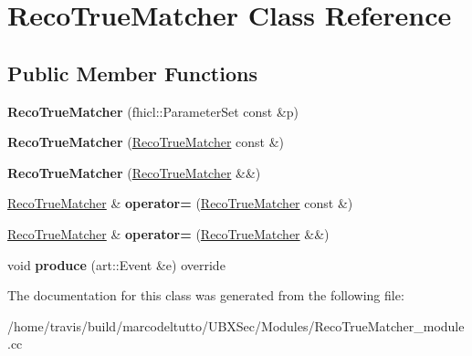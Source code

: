 \hypertarget{classRecoTrueMatcher}{\section{\-Reco\-True\-Matcher \-Class \-Reference}
\label{classRecoTrueMatcher}
}
\subsection*{\-Public \-Member \-Functions}
\begin{DoxyCompactItemize}
\item 
\hypertarget{classRecoTrueMatcher_a85eaff8fb078f81ef1ecd449ff41d694}{{\bfseries \-Reco\-True\-Matcher} (fhicl\-::\-Parameter\-Set const \&p)}\label{classRecoTrueMatcher_a85eaff8fb078f81ef1ecd449ff41d694}

\item 
\hypertarget{classRecoTrueMatcher_a4a04d47a0ea7b765f5be3091efbbfbae}{{\bfseries \-Reco\-True\-Matcher} (\hyperlink{classRecoTrueMatcher}{\-Reco\-True\-Matcher} const \&)}\label{classRecoTrueMatcher_a4a04d47a0ea7b765f5be3091efbbfbae}

\item 
\hypertarget{classRecoTrueMatcher_a2166966091ff725010f0d1bfe00dc635}{{\bfseries \-Reco\-True\-Matcher} (\hyperlink{classRecoTrueMatcher}{\-Reco\-True\-Matcher} \&\&)}\label{classRecoTrueMatcher_a2166966091ff725010f0d1bfe00dc635}

\item 
\hypertarget{classRecoTrueMatcher_aaad6699537973d245f8ae3735d8c96ef}{\hyperlink{classRecoTrueMatcher}{\-Reco\-True\-Matcher} \& {\bfseries operator=} (\hyperlink{classRecoTrueMatcher}{\-Reco\-True\-Matcher} const \&)}\label{classRecoTrueMatcher_aaad6699537973d245f8ae3735d8c96ef}

\item 
\hypertarget{classRecoTrueMatcher_a2c4d6d22661c6cc9f11a779d1cb4c481}{\hyperlink{classRecoTrueMatcher}{\-Reco\-True\-Matcher} \& {\bfseries operator=} (\hyperlink{classRecoTrueMatcher}{\-Reco\-True\-Matcher} \&\&)}\label{classRecoTrueMatcher_a2c4d6d22661c6cc9f11a779d1cb4c481}

\item 
\hypertarget{classRecoTrueMatcher_a9c4e732a8dba26adf726235777c2a441}{void {\bfseries produce} (art\-::\-Event \&e) override}\label{classRecoTrueMatcher_a9c4e732a8dba26adf726235777c2a441}

\end{DoxyCompactItemize}


\-The documentation for this class was generated from the following file\-:\begin{DoxyCompactItemize}
\item 
/home/travis/build/marcodeltutto/\-U\-B\-X\-Sec/\-Modules/\-Reco\-True\-Matcher\-\_\-module.\-cc\end{DoxyCompactItemize}
